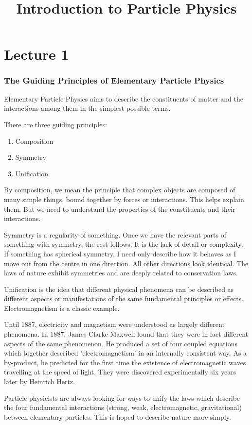 \documentclass[10pt,a4paper]{article}
\title{Introduction to Particle Physics}
\begin{document}
\part*{Lecture 1}

\section*{The Guiding Principles of Elementary Particle Physics}

Elementary Particle Physics aims to describe the constituents of matter and the interactions among them in the simplest possible terms.

There are three guiding principles:

\begin{enumerate}
\item Composition
\item Symmetry
\item Unification
\end{enumerate}

By composition, we mean the principle that complex objects are composed of many simple things, bound together by forces or interactions. This helps explain them. But we need to understand the properties of the constituents and their interactions.

Symmetry is a regularity of something. Once we have the relevant parts of something with symmetry, the rest follows. It is the lack of detail or complexity. If something has spherical symmetry, I need only describe how it behaves as I move out from the centre in one direction. All other directions look identical. The laws of nature exhibit symmetries and are deeply related to conservation laws.

Unification is the idea that different physical phenomena can be described as different aspects or manifestations of the same fundamental principles or effects. Electromagnetism is a classic example.

Until 1887, electricity and magnetism were understood as largely different phenomena. In 1887, James Clarke Maxwell found that they were in fact different aspects of the same phenomenon. He produced a set of four coupled equations which together described 'electromagnetism' in an internally consistent way. As a by-product, he predicted for the first time the existence of electromagnetic waves travelling at the speed of light. They were discovered experimentally six years later by Heinrich Hertz.

Particle physicists are always looking for ways to unify the laws which describe the four fundamental interactions (strong, weak, electromagnetic, gravitational) between elementary particles. This is hoped to describe nature more simply.
\end{document}
